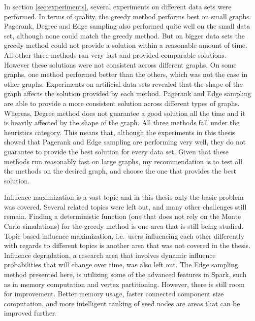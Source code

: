 \documentclass[english]{tktltiki}
\begin{document}
In section \ref{sec:experiments}, several experiments on different data sets were performed.
In terms of quality, the greedy method performs best on small graphs. 
Pagerank, Degree and Edge sampling also performed quite well on the small data set, although none could match the greedy method.
But on bigger data sets the greedy method could not provide a solution within a reasonable amount of time.
All other three methods ran very fast and provided comparable solutions.
However these solutions were not consistent across different graphs.
On some graphs, one method performed better than the others, which was not the case in other graphs.
Experiments on artificial data sets revealed that the shape of the graph affects the solution provided by each method.
Pagerank and Edge sampling are able to provide a more consistent solution across different types of graphs.
Whereas, Degree method does not guarantee a good solution all the time and it is heavily affected by the shape of the graph.
All three methods fall under the heuristics category. 
This means that, although the experiments in this thesis showed that Pagerank and Edge sampling are performing very well, they do not guarantee to provide the best solution for every data set. 
Given that these methods run reasonably fast on large graphs, my recommendation is to test all the methods on the desired graph, and choose the one that provides the best solution.

Influence maximization is a vast topic and in this thesis only the basic problem was covered. 
Several related topics were left out, and many other challenges still remain. 
Finding a deterministic function (one that does not rely on the Monte Carlo simulations) for the greedy method is one area that is still being studied. 
Topic based influence maximization, i.e.\ users influencing each other differently with regards to different topics is another area that was not covered in the thesis. 
Influence degradation, a research area that involves dynamic influence probabilities that will change over time, was also left out.
The Edge sampling method presented here, is utilizing some of the advanced features in Spark, such as in memory computation and vertex partitioning.
However, there is still room for improvement. 
Better memory usage, faster connected component size computation, and more intelligent ranking of seed nodes are areas that can be improved further.




\pagebreak



\lastpage

\appendices

\pagestyle{empty}
\end{document}

